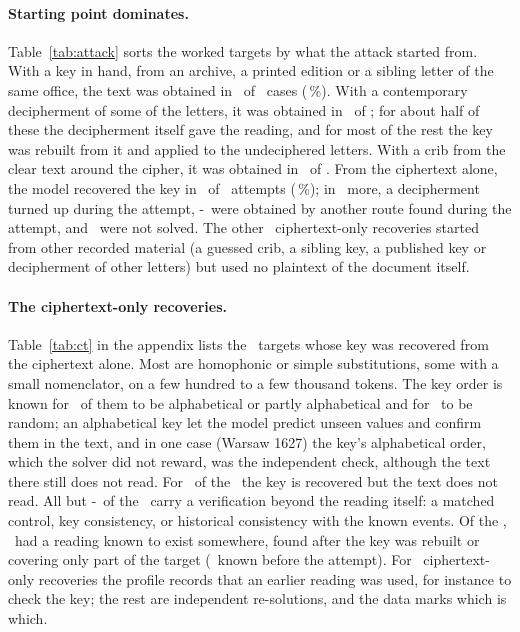 \documentclass[11pt]{article}
\begin{document}
\paragraph{Starting point dominates.} Table~\ref{tab:attack} sorts the worked targets by what the attack started from. With a key in hand, from an archive, a printed edition or a sibling letter of the same office, the text was obtained in \Nkeyedobtained\ of \Nkeyed\ cases (\Nkeyedpct\,\%). With a contemporary decipherment of some of the letters, it was obtained in \Ndecstartobtained\ of \Ndecstart; for about half of these the decipherment itself gave the reading, and for most of the rest the key was rebuilt from it and applied to the undeciphered letters. With a crib from the clear text around the cipher, it was obtained in \Ncribobtained\ of \Ncrib. From the ciphertext alone, the model recovered the key in \NctoCT\ of \Ncto\ attempts (\NctoPct\,\%); in \NctoDEC\ more, a decipherment turned up during the attempt, \the\numexpr\NctoOther-\NctoDEC\relax\ were obtained by another route found during the attempt, and \NctoNot\ were not solved. The other \NCTnotcto\ ciphertext-only recoveries started from other recorded material (a guessed crib, a sibling key, a published key or decipherment of other letters) but used no plaintext of the document itself.

\paragraph{The ciphertext-only recoveries.} Table~\ref{tab:ct} in the appendix lists the \NCT\ targets whose key was recovered from the ciphertext alone. Most are homophonic or simple substitutions, some with a small nomenclator, on a few hundred to a few thousand tokens. The key order is known for \NCTalpha\ of them to be alphabetical or partly alphabetical and for \NCTrandom\ to be random; an alphabetical key let the model predict unseen values and confirm them in the text, and in one case (Warsaw 1627) the key's alphabetical order, which the solver did not reward, was the independent check, although the text there still does not read. For \NkeyOnlyCT\ of the \NCT\ the key is recovered but the text does not read. All but \the\numexpr\NCT-\NCTverified\relax\ of the \NCT\ carry a verification beyond the reading itself: a matched control, key consistency, or historical consistency with the known events. Of the \NCT, \NCTprior\ had a reading known to exist somewhere, found after the key was rebuilt or covering only part of the target (\NCTpriorbefore\ known before the attempt). For \NCTpriorused\ ciphertext-only recoveries the profile records that an earlier reading was used, for instance to check the key; the rest are independent re-solutions, and the data marks which is which.
\end{document}
